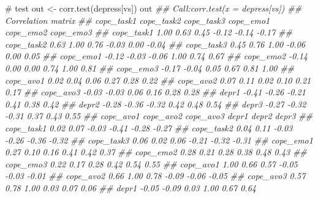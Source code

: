 \documentclass[
  chinese-hans,
  letterpaper,
  DIV=11,
  numbers=noendperiod]{scrartcl}
\newenvironment{Shaded}{\begin{snugshade}}{\end{snugshade}}
\newcommand{\CommentTok}[1]{\textcolor[rgb]{0.37,0.37,0.37}{#1}}
\newcommand{\DocumentationTok}[1]{\textcolor[rgb]{0.37,0.37,0.37}{\textit{#1}}}
\newcommand{\FunctionTok}[1]{\textcolor[rgb]{0.28,0.35,0.67}{#1}}
\newcommand{\NormalTok}[1]{\textcolor[rgb]{0.00,0.23,0.31}{#1}}
\newcommand{\OtherTok}[1]{\textcolor[rgb]{0.00,0.23,0.31}{#1}}
\begin{document}
\begin{Shaded}
\begin{Highlighting}[numbers=left,,]
\CommentTok{\# test}
\NormalTok{out }\OtherTok{\textless{}{-}} \FunctionTok{corr.test}\NormalTok{(depress[vs])}
\NormalTok{out}
\DocumentationTok{\#\# Call:corr.test(x = depress[vs])}
\DocumentationTok{\#\# Correlation matrix }
\DocumentationTok{\#\#            cope\_task1 cope\_task2 cope\_task3 cope\_emo1 cope\_emo2 cope\_emo3}
\DocumentationTok{\#\# cope\_task1       1.00       0.63       0.45     {-}0.12     {-}0.14     {-}0.17}
\DocumentationTok{\#\# cope\_task2       0.63       1.00       0.76     {-}0.03      0.00     {-}0.04}
\DocumentationTok{\#\# cope\_task3       0.45       0.76       1.00     {-}0.06      0.00      0.05}
\DocumentationTok{\#\# cope\_emo1       {-}0.12      {-}0.03      {-}0.06      1.00      0.74      0.67}
\DocumentationTok{\#\# cope\_emo2       {-}0.14       0.00       0.00      0.74      1.00      0.81}
\DocumentationTok{\#\# cope\_emo3       {-}0.17      {-}0.04       0.05      0.67      0.81      1.00}
\DocumentationTok{\#\# cope\_avo1        0.02       0.04       0.06      0.27      0.28      0.22}
\DocumentationTok{\#\# cope\_avo2        0.07       0.11       0.02      0.10      0.21      0.17}
\DocumentationTok{\#\# cope\_avo3       {-}0.03      {-}0.03       0.06      0.16      0.28      0.28}
\DocumentationTok{\#\# depr1           {-}0.41      {-}0.26      {-}0.21      0.41      0.38      0.42}
\DocumentationTok{\#\# depr2           {-}0.28      {-}0.36      {-}0.32      0.42      0.48      0.54}
\DocumentationTok{\#\# depr3           {-}0.27      {-}0.32      {-}0.31      0.37      0.43      0.55}
\DocumentationTok{\#\#            cope\_avo1 cope\_avo2 cope\_avo3 depr1 depr2 depr3}
\DocumentationTok{\#\# cope\_task1      0.02      0.07     {-}0.03 {-}0.41 {-}0.28 {-}0.27}
\DocumentationTok{\#\# cope\_task2      0.04      0.11     {-}0.03 {-}0.26 {-}0.36 {-}0.32}
\DocumentationTok{\#\# cope\_task3      0.06      0.02      0.06 {-}0.21 {-}0.32 {-}0.31}
\DocumentationTok{\#\# cope\_emo1       0.27      0.10      0.16  0.41  0.42  0.37}
\DocumentationTok{\#\# cope\_emo2       0.28      0.21      0.28  0.38  0.48  0.43}
\DocumentationTok{\#\# cope\_emo3       0.22      0.17      0.28  0.42  0.54  0.55}
\DocumentationTok{\#\# cope\_avo1       1.00      0.66      0.57 {-}0.05 {-}0.03 {-}0.01}
\DocumentationTok{\#\# cope\_avo2       0.66      1.00      0.78 {-}0.09 {-}0.06 {-}0.05}
\DocumentationTok{\#\# cope\_avo3       0.57      0.78      1.00  0.03  0.07  0.06}
\DocumentationTok{\#\# depr1          {-}0.05     {-}0.09      0.03  1.00  0.67  0.64}

\end{Highlighting}
\end{Shaded}
\end{document}
